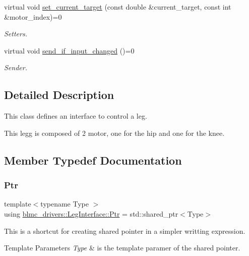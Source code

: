\begin{DoxyCompactItemize}
virtual void \hyperlink{classblmc__drivers_1_1LegInterface_a6917a158f12589c9ee6aa45304fdafce}{set\+\_\+current\+\_\+target} (const double \&current\+\_\+target, const int \&motor\+\_\+index)=0
\begin{DoxyCompactList}\small\item\em Setters. \end{DoxyCompactList}\item 
virtual void \hyperlink{classblmc__drivers_1_1LegInterface_aaf3d3759b63a3ffe7e9cee360302f9b7}{send\+\_\+if\+\_\+input\+\_\+changed} ()=0
\begin{DoxyCompactList}\small\item\em Sender. \end{DoxyCompactList}\end{DoxyCompactItemize}


\subsection{Detailed Description}
This class defines an interface to control a leg. 

This legg is composed of 2 motor, one for the hip and one for the knee. 

\subsection{Member Typedef Documentation}
\mbox{\label{classblmc__drivers_1_1LegInterface_ac5af9e6514abff5ee918813925a8e42d}} 
\subsubsection{\texorpdfstring{Ptr}{Ptr}}
{\footnotesize\ttfamily template$<$typename Type $>$ \\
using \hyperlink{classblmc__drivers_1_1LegInterface_ac5af9e6514abff5ee918813925a8e42d}{blmc\+\_\+drivers\+::\+Leg\+Interface\+::\+Ptr} =  std\+::shared\+\_\+ptr$<$Type$>$}



This is a shortcut for creating shared pointer in a simpler writting expression. 


\begin{DoxyTemplParams}{Template Parameters}
{\em Type} & is the template paramer of the shared pointer. \\
\hline
\end{DoxyTemplParams}


